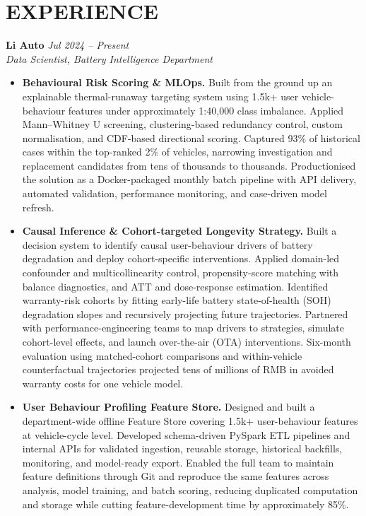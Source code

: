 \documentclass[a4paper,10pt]{article}
\begin{document}
\section{EXPERIENCE}
\textbf{Li Auto} \hfill \textit{Jul 2024 -- Present}\\
\textit{Data Scientist, Battery Intelligence Department}
\begin{itemize}
\item \textbf{Behavioural Risk Scoring \& MLOps.} Built from the ground up an explainable thermal-runaway targeting system using 1.5k+ user vehicle-behaviour features under approximately 1:40,000 class imbalance. Applied Mann--Whitney U screening, clustering-based redundancy control, custom normalisation, and CDF-based directional scoring. Captured 93\% of historical cases within the top-ranked 2\% of vehicles, narrowing investigation and replacement candidates from tens of thousands to thousands. Productionised the solution as a Docker-packaged monthly batch pipeline with API delivery, automated validation, performance monitoring, and case-driven model refresh.
\item \textbf{Causal Inference \& Cohort-targeted Longevity Strategy.} Built a decision system to identify causal user-behaviour drivers of battery degradation and deploy cohort-specific interventions. Applied domain-led confounder and multicollinearity control, propensity-score matching with balance diagnostics, and ATT and dose-response estimation. Identified warranty-risk cohorts by fitting early-life battery state-of-health (SOH) degradation slopes and recursively projecting future trajectories. Partnered with performance-engineering teams to map drivers to strategies, simulate cohort-level effects, and launch over-the-air (OTA) interventions. Six-month evaluation using matched-cohort comparisons and within-vehicle counterfactual trajectories projected tens of millions of RMB in avoided warranty costs for one vehicle model.
\item \textbf{User Behaviour Profiling Feature Store.} Designed and built a department-wide offline Feature Store covering 1.5k+ user-behaviour features at vehicle-cycle level. Developed schema-driven PySpark ETL pipelines and internal APIs for validated ingestion, reusable storage, historical backfills, monitoring, and model-ready export. Enabled the full team to maintain feature definitions through Git and reproduce the same features across analysis, model training, and batch scoring, reducing duplicated computation and storage while cutting feature-development time by approximately 85\%.

\end{itemize}
\end{document}
